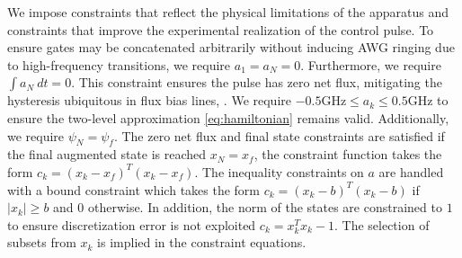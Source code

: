 We impose constraints that
reflect the physical limitations of the apparatus and 
constraints that improve the experimental realization of the control pulse.
To ensure gates may be concatenated arbitrarily without
inducing AWG ringing due to high-frequency transitions,
we require $a_{1} = a_{N} = 0$.
Furthermore, we require $\int a_{N} \ dt = 0$. This
constraint ensures the pulse has zero net flux, mitigating
the hysteresis ubiquitous in flux bias lines,
\cite{battistel2019fast, krantz2019quantum, zhang2020universal}.
We require $-0.5 \textrm{GHz} \le a_{k} \le 0.5 \textrm{GHz}$
to ensure the two-level approximation \eqref{eq:hamiltonian}
remains valid. Additionally, we require
$\psi_{N} = \psi_{f}$.
The zero net flux and final state constraints
are satisfied if the final augmented state is
reached $x_{N} = x_{f}$, the constraint function
takes the form
$c_{k} = (x_{k} - x_{f})^{T}(x_{k} - x_{f})$.
The inequality constraints on $a$ are handled
with a bound constraint which takes the form
$c_{k} = (x_{k} - b)^{T}(x_{k} - b)$ if $\lvert x_{k} \rvert \ge b$
and $0$ otherwise.
In addition, the norm of the states
are constrained to $1$ to ensure discretization error is not
exploited $c_{k} = x_{k}^{T}x_{k} - 1$. The selection
of subsets from $x_{k}$ is implied in
the constraint equations.

